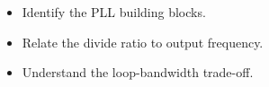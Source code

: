 \begin{objectives}
\begin{itemize}[leftmargin=1.4em,itemsep=2pt]
\item Identify the PLL building blocks.
\item Relate the divide ratio to output frequency.
\item Understand the loop-bandwidth trade-off.
\end{itemize}
\end{objectives}
